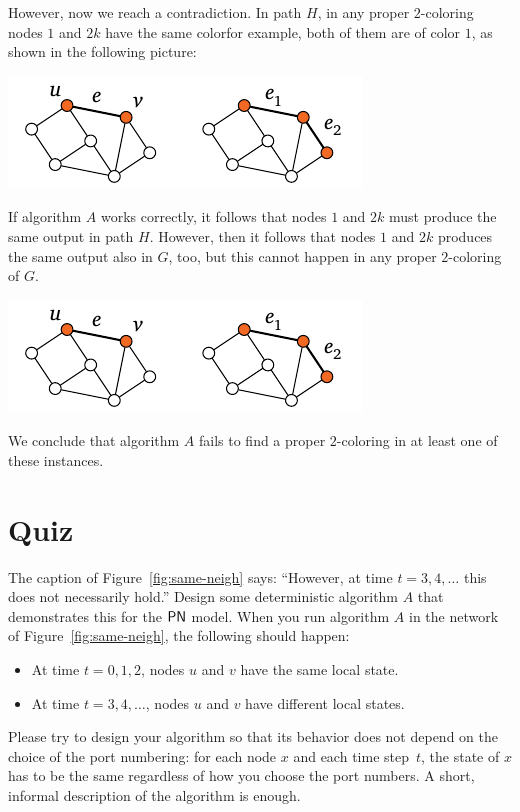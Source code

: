 However, now we reach a contradiction. In path $H$, in any proper $2$-coloring nodes $1$ and $2k$ have the same color\mydash for example, both of them are of color $1$, as shown in the following picture:
\begin{center}
    \includegraphics[page=\PIntroLbTwoD]{figs.pdf}
\end{center}
If algorithm $A$ works correctly, it follows that nodes $1$ and $2k$ must produce the same output in path $H$. However, then it follows that nodes $1$ and $2k$ produces the same output also in $G$, too, but this cannot happen in any proper $2$-coloring of $G$.
\begin{center}
    \includegraphics[page=\PIntroLbTwoE]{figs.pdf}
\end{center}
We conclude that algorithm $A$ fails to find a proper $2$-coloring in at least one of these instances.

\section{Quiz}

The caption of Figure~\ref{fig:same-neigh} says: ``However, at time $t = 3, 4, \dotsc$ this does not necessarily hold.'' Design some deterministic algorithm $A$ that demonstrates this for the $\textup{\sffamily PN}$ model. When you run algorithm $A$ in the network of Figure~\ref{fig:same-neigh}, the following should happen:
\begin{itemize}[noitemsep]
    \item At time $t = 0, 1, 2$, nodes $u$ and $v$ have the same local state.
    \item At time $t = 3, 4, \dotsc$, nodes $u$ and $v$ have different local states.
\end{itemize}
Please try to design your algorithm so that its behavior does not depend on the choice of the port numbering: for each node $x$ and each time step~$t$, the state of $x$ has to be the same regardless of how you choose the port numbers. A short, informal description of the algorithm is enough.

